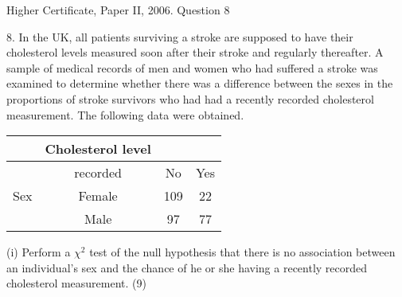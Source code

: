 \documentclass[a4paper,12pt]{article}
\begin{document}
Higher Certificate, Paper II, 2006.  Question 8 
\begin{framed}
8. In the UK, all patients surviving a stroke are supposed to have their cholesterol levels measured soon after their stroke and regularly thereafter.  A sample of medical records of men and women who had suffered a stroke was examined to determine whether there was a difference between the sexes in the proportions of stroke survivors who had had a recently recorded cholesterol measurement.  The following data were obtained.
\begin{center}
 \begin{tabular}{|c|c|c|c|} \hline
  & Cholesterol level && \\ \hline
  & recorded &   No& Yes \\ \hline \hline
  Sex & Female & 109&  22\\ \hline
      & Male & 97&  77\\ \hline
 \end{tabular}
 \end{center}
 
(i) Perform a $\chi^2$ test of the null hypothesis that there is no association between an individual's sex and the chance of he or she having a recently recorded cholesterol measurement. (9) 
 
 
\end{framed}
\end{document}
